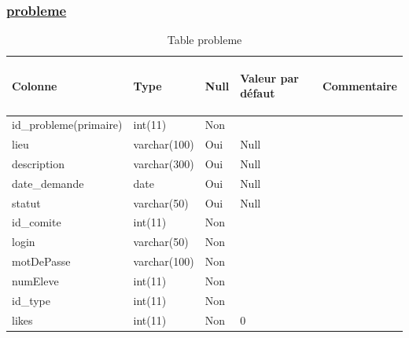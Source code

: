 \documentclass[11.5pt]{report}
\begin{document}
\subsubsection{\underline{probleme}}
\begin{table}[h]
	\begin{center}
	
	\begin{tabular}{|l|l|l|l|l|}
		\hline
		\begin{bf}Colonne\end{bf} & \begin{bf}Type\end{bf} & \begin{bf}Null\end{bf} & \begin{bf}Valeur par défaut\end{bf} & \begin{bf}Commentaire\end{bf}  \\
		\hline
		id\_probleme(primaire) & int(11) & Non & & \\
		\hline
		lieu & varchar(100) & Oui &Null & \\
		\hline
		description & varchar(300) & Oui &Null & \\
		\hline
		date\_demande & date & Oui &Null & \\
		\hline
		statut & varchar(50) & Oui &Null & \\
		\hline
		id\_comite & int(11) & Non & & \\
		\hline
		login & varchar(50) & Non & & \\
		\hline
		motDePasse & varchar(100) & Non & & \\
		\hline
		numEleve & int(11) & Non & & \\
		\hline
		id\_type & int(11) & Non & & \\
		\hline
		likes & int(11) & Non &0 & \\
		\hline
		
		
		
	\end{tabular}
	\caption{Table probleme}
\end{center}
\end{table}
\end{document}
